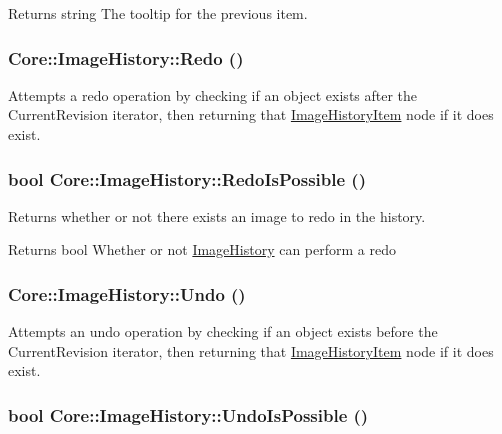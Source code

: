 \begin{DoxyReturn}{Returns}
string The tooltip for the previous item. 
\end{DoxyReturn}
\hypertarget{class_core_1_1_image_history_abb49be956c8ba3a17e054078a09d1018}{
\subsubsection[{Redo}]{ Core::ImageHistory::Redo ()}}
\label{class_core_1_1_image_history_abb49be956c8ba3a17e054078a09d1018}
Attempts a redo operation by checking if an object exists after the CurrentRevision iterator, then returning that \hyperlink{class_core_1_1_image_history_item}{ImageHistoryItem} node if it does exist. \hypertarget{class_core_1_1_image_history_adefaa91513a3548c5a85d0b3247b7063}{
\subsubsection[{RedoIsPossible}]{\setlength{\rightskip}{0pt plus 5cm}bool Core::ImageHistory::RedoIsPossible ()}}
\label{class_core_1_1_image_history_adefaa91513a3548c5a85d0b3247b7063}
Returns whether or not there exists an image to redo in the history. \begin{DoxyReturn}{Returns}
bool Whether or not \hyperlink{class_core_1_1_image_history}{ImageHistory} can perform a redo 
\end{DoxyReturn}
\hypertarget{class_core_1_1_image_history_a61c5c700c73a60c3c4bec95d530f6379}{
\subsubsection[{Undo}]{ Core::ImageHistory::Undo ()}}
\label{class_core_1_1_image_history_a61c5c700c73a60c3c4bec95d530f6379}
Attempts an undo operation by checking if an object exists before the CurrentRevision iterator, then returning that \hyperlink{class_core_1_1_image_history_item}{ImageHistoryItem} node if it does exist. \hypertarget{class_core_1_1_image_history_a45908055c40dd586e4f426b7eab3ee3e}{
\subsubsection[{UndoIsPossible}]{\setlength{\rightskip}{0pt plus 5cm}bool Core::ImageHistory::UndoIsPossible ()}}
